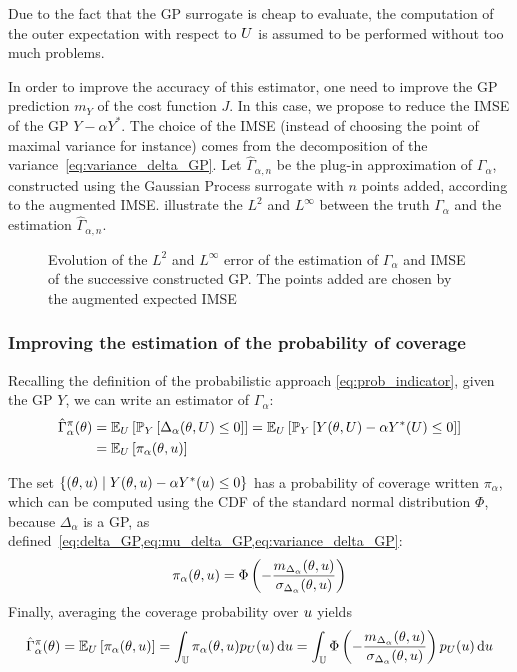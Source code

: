 \documentclass[../../Main_ManuscritThese.tex]{subfiles}
\newcommand\imgpath{/home/victor/acadwriting/Manuscrit/Text/Chapter4/img/}
\begin{document}
  Due to the fact that the GP surrogate is cheap to evaluate, the computation of the outer expectation with respect to $U$ is assumed to be performed without too much problems.

  In order to improve the accuracy of this estimator, one need to improve the GP prediction $m_Y$ of the cost function $J$.
  In this case, we propose to reduce the IMSE of the GP $Y - \alpha Y^*$. The choice of the IMSE (instead of choosing the point of maximal variance for instance) comes from the decomposition of the variance~\cref{eq:variance_delta_GP}.
  Let $\hat{\Gamma}_{\alpha,n}$ be the plug-in approximation of $\Gamma_\alpha$, constructed using the Gaussian Process surrogate with $n$ points added, according to the augmented IMSE.  illustrate the $L^2$ and $L^{\infty}$ between the truth $\Gamma_\alpha$ and the estimation $\hat{\Gamma}_{\alpha,n}$.

\begin{figure}[ht]
  \centering
  
  \caption{\label{fig:IMSE_enrichment} Evolution of the $L^2$ and $L^\infty$ error of the estimation of $\Gamma_\alpha$ and IMSE of the successive constructed GP. The points added are chosen by the augmented expected IMSE}
\end{figure}

  
\subsubsection{Improving the estimation of the probability of coverage}
Recalling the definition of the probabilistic approach \cref{eq:prob_indicator}, given the GP $Y$, we can write an estimator of $\Gamma_{\alpha}$:
\begin{align}
  \hat{\Gamma}_{\alpha}^{\pi}(\theta) &= \mathbb{E}_U\left[ \mathbb{P}_{Y}\left[ \Delta_{\alpha}(\theta,U) \leq 0\right]\right] = \mathbb{E}_U\left[ \mathbb{P}_{Y}\left[ Y(\theta, U) - \alpha Y^*(U) \leq 0\right]\right] \\ &= \mathbb{E}_U\left[\pi_{\alpha}(\theta,u)\right]
\end{align}

  
The set $\{(\theta, u) \mid Y(\theta, u) - \alpha Y^*(u)\leq 0\}$ has a probability of coverage written $\pi_{\alpha}$, which can be computed using the CDF of the standard normal distribution $\Phi$, because $\Delta_{\alpha}$ is a GP, as defined~\cref{eq:delta_GP,eq:mu_delta_GP,eq:variance_delta_GP}:
\begin{equation}
  \label{eq:def_pialphaku}
  \pi_{\alpha}(\theta,u) = \Phi\left(-\frac{m_{\Delta_\alpha}(\theta,u)}{\sigma_{\Delta_\alpha}(\theta,u)}\right)
\end{equation}
Finally, averaging the coverage probability over $u$ yields
\begin{equation}
  \hat{\Gamma}_{\alpha}^{\pi}(\theta) = \mathbb{E}_U\left[\pi_{\alpha}(\theta,u)\right]=\int_{\mathbb{U}}\pi_{\alpha}(\theta,u)p_{U}(u) \,\mathrm{d}u = \int_{\mathbb{U}}\Phi\left(-\frac{m_{\Delta_\alpha}(\theta,u)}{\sigma_{\Delta_\alpha}(\theta,u)}\right)p_{U}(u) \,\mathrm{d}u
\end{equation}
\end{document}
